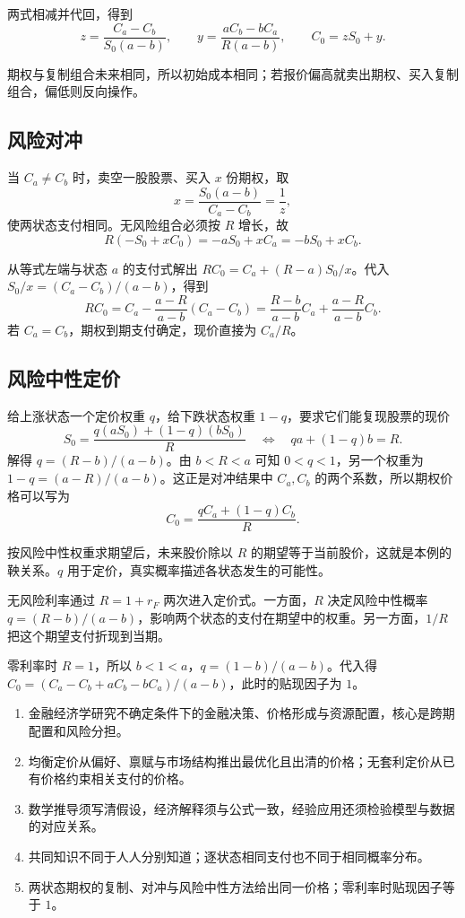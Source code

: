 两式相减并代回，得到
\[
 z=\frac{C_a-C_b}{S_0(a-b)},\qquad
 y=\frac{aC_b-bC_a}{R(a-b)},\qquad C_0=zS_0+y.
\]

期权与复制组合未来相同，所以初始成本相同；若报价偏高就卖出期权、买入复制组合，偏低则反向操作。

\subsection{风险对冲}
当 $C_a\ne C_b$ 时，卖空一股股票、买入 $x$ 份期权，取
\[
 x=\frac{S_0(a-b)}{C_a-C_b}=\frac1z,
\]
使两状态支付相同。无风险组合必须按 $R$ 增长，故
\[
 R(-S_0+xC_0)=-aS_0+xC_a=-bS_0+xC_b.
\]

从等式左端与状态 $a$ 的支付式解出 $RC_0=C_a+(R-a)S_0/x$。代入 $S_0/x=(C_a-C_b)/(a-b)$，得到
\[
 RC_0
 =C_a-\frac{a-R}{a-b}(C_a-C_b)
 =\frac{R-b}{a-b}C_a+\frac{a-R}{a-b}C_b.
\]
若 $C_a=C_b$，期权到期支付确定，现价直接为 $C_a/R$。

\subsection{风险中性定价}
给上涨状态一个定价权重 $q$，给下跌状态权重 $1-q$，要求它们能复现股票的现价
\[
 S_0=\frac{q(aS_0)+(1-q)(bS_0)}{R}
 \quad\Longleftrightarrow\quad
 qa+(1-q)b=R.
\]
解得 $q=(R-b)/(a-b)$。由 $b<R<a$ 可知 $0<q<1$，另一个权重为 $1-q=(a-R)/(a-b)$。这正是对冲结果中 $C_a,C_b$ 的两个系数，所以期权价格可以写为
\[
 \boxed{C_0=\frac{qC_a+(1-q)C_b}{R}.}
\]

按风险中性权重求期望后，未来股价除以 $R$ 的期望等于当前股价，这就是本例的鞅关系。$q$ 用于定价，真实概率描述各状态发生的可能性。

无风险利率通过 $R=1+r_F$ 两次进入定价式。一方面，$R$ 决定风险中性概率 $q=(R-b)/(a-b)$，影响两个状态的支付在期望中的权重。另一方面，$1/R$ 把这个期望支付折现到当期。

零利率时 $R=1$，所以 $b<1<a$，$q=(1-b)/(a-b)$。代入得 $C_0=(C_a-C_b+aC_b-bC_a)/(a-b)$，此时的贴现因子为 $1$。


\WJChapterSummary
\begin{tcolorbox}[summary]
\begin{enumerate}
 \item 金融经济学研究不确定条件下的金融决策、价格形成与资源配置，核心是跨期配置和风险分担。
 \item 均衡定价从偏好、禀赋与市场结构推出最优化且出清的价格；无套利定价从已有价格约束相关支付的价格。
 \item 数学推导须写清假设，经济解释须与公式一致，经验应用还须检验模型与数据的对应关系。
 \item 共同知识不同于人人分别知道；逐状态相同支付也不同于相同概率分布。
 \item 两状态期权的复制、对冲与风险中性方法给出同一价格；零利率时贴现因子等于 $1$。
\end{enumerate}
\end{tcolorbox}

\endgroup
